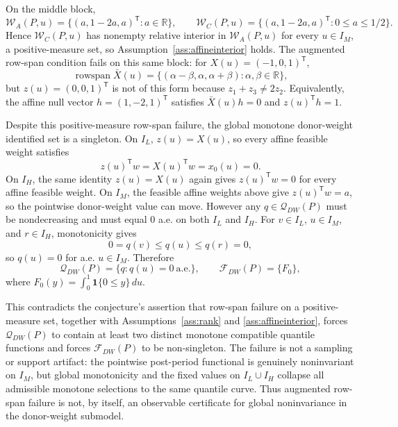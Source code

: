 \documentclass[11pt]{article}
\newcommand{\one}{\mathbf{1}}
\newcommand{\transpose}{\mathsf{T}}
\theoremstyle{definition}
\theoremstyle{plain}
\theoremstyle{remark}
\begin{document}
On the middle block,
\[
\mathcal{W}_A(P,u)=\{(a,1-2a,a)^\transpose:a\in\mathbb R\},
\qquad
\mathcal{W}_C(P,u)=\{(a,1-2a,a)^\transpose:0\le a\le 1/2\}.
\]
Hence \(\mathcal{W}_C(P,u)\) has nonempty relative interior in \(\mathcal{W}_A(P,u)\) for every \(u\in I_M\), a positive-measure set, so Assumption~\ref{ass:affineinterior} holds.
The augmented row-span condition fails on this same block: for \(X(u)=(-1,0,1)^\transpose\),
\[
\operatorname{rowspan}\bar X(u)
=\{(\alpha-\beta,\alpha,\alpha+\beta):\alpha,\beta\in\mathbb R\},
\]
but \(z(u)=(0,0,1)^\transpose\) is not of this form because \(z_1+z_3\ne 2z_2\).
Equivalently, the affine null vector \(h=(1,-2,1)^\transpose\) satisfies \(\bar X(u)h=0\) and \(z(u)^\transpose h=1\).

Despite this positive-measure row-span failure, the global monotone donor-weight identified set is a singleton.
On \(I_L\), \(z(u)=X(u)\), so every affine feasible weight satisfies
\[
z(u)^\transpose w=X(u)^\transpose w=x_0(u)=0.
\]
On \(I_H\), the same identity \(z(u)=X(u)\) again gives \(z(u)^\transpose w=0\) for every affine feasible weight.
On \(I_M\), the feasible affine weights above give \(z(u)^\transpose w=a\), so the pointwise donor-weight value can move.
However any \(q\in\mathcal{Q}_{DW}(P)\) must be nondecreasing and must equal \(0\) a.e. on both \(I_L\) and \(I_H\).
For \(v\in I_L\), \(u\in I_M\), and \(r\in I_H\), monotonicity gives
\[
0=q(v)\le q(u)\le q(r)=0,
\]
so \(q(u)=0\) for a.e. \(u\in I_M\).
Therefore
\[
\mathcal{Q}_{DW}(P)=\{q:q(u)=0\ \text{a.e.}\},
\qquad
\mathcal{F}_{DW}(P)=\{F_0\},
\]
where \(F_0(y)=\int_0^1\one\{0\le y\}\,du\).

This contradicts the conjecture's assertion that row-span failure on a positive-measure set, together with Assumptions~\ref{ass:rank} and \ref{ass:affineinterior}, forces \(\mathcal{Q}_{DW}(P)\) to contain at least two distinct monotone compatible quantile functions and forces \(\mathcal{F}_{DW}(P)\) to be non-singleton.
The failure is not a sampling or support artifact: the pointwise post-period functional is genuinely noninvariant on \(I_M\), but global monotonicity and the fixed values on \(I_L\cup I_H\) collapse all admissible monotone selections to the same quantile curve.
Thus augmented row-span failure is not, by itself, an observable certificate for global noninvariance in the donor-weight submodel.
\end{document}
